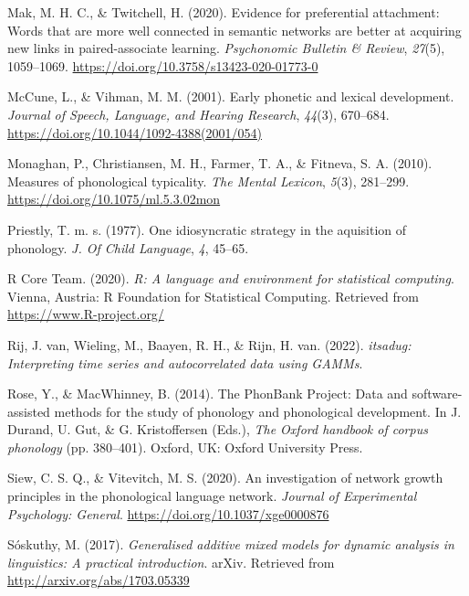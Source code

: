 \documentclass[
  man]{apa6}
\newlength{\cslhangindent}
\newlength{\cslentryspacingunit} %
\newenvironment{CSLReferences}[2] %
 {%
  \setlength{\parindent}{0pt}
  \ifodd #1
  \let\oldpar\par
  \def\par{\hangindent=\cslhangindent\oldpar}
  \fi
  \setlength{\parskip}{#2\cslentryspacingunit}
 }%
 {}
\begin{document}
\begin{CSLReferences}{1}{0}
\leavevmode{}%
Mak, M. H. C., \& Twitchell, H. (2020). Evidence for preferential attachment: Words that are more well connected in semantic networks are better at acquiring new links in paired-associate learning. \emph{Psychonomic Bulletin \& Review}, \emph{27}(5), 1059--1069. \url{https://doi.org/10.3758/s13423-020-01773-0}

\leavevmode{}%
McCune, L., \& Vihman, M. M. (2001). Early phonetic and lexical development. \emph{Journal of Speech, Language, and Hearing Research}, \emph{44}(3), 670--684. \url{https://doi.org/10.1044/1092-4388(2001/054)}

\leavevmode{}%
Monaghan, P., Christiansen, M. H., Farmer, T. A., \& Fitneva, S. A. (2010). Measures of phonological typicality. \emph{The Mental Lexicon}, \emph{5}(3), 281--299. \url{https://doi.org/10.1075/ml.5.3.02mon}

\leavevmode{}%
Priestly, T. m. s. (1977). One idiosyncratic strategy in the aquisition of phonology. \emph{J. Of Child Language}, \emph{4}, 45--65.

\leavevmode{}%
R Core Team. (2020). \emph{R: A language and environment for statistical computing}. Vienna, Austria: R Foundation for Statistical Computing. Retrieved from \url{https://www.R-project.org/}

\leavevmode{}%
Rij, J. van, Wieling, M., Baayen, R. H., \& Rijn, H. van. (2022). \emph{{itsadug}: Interpreting time series and autocorrelated data using GAMMs}.

\leavevmode{}%
Rose, Y., \& MacWhinney, B. (2014). The {PhonBank} {Project}: {Data} and software-assisted methods for the study of phonology and phonological development. In J. Durand, U. Gut, \& G. Kristoffersen (Eds.), \emph{The {Oxford} handbook of corpus phonology} (pp. 380--401). Oxford, UK: Oxford University Press.

\leavevmode{}%
Siew, C. S. Q., \& Vitevitch, M. S. (2020). An investigation of network growth principles in the phonological language network. \emph{Journal of Experimental Psychology: General}. \url{https://doi.org/10.1037/xge0000876}

\leavevmode{}%
Sóskuthy, M. (2017). \emph{Generalised additive mixed models for dynamic analysis in linguistics: A practical introduction}. arXiv. Retrieved from \url{http://arxiv.org/abs/1703.05339}


\end{CSLReferences}
\end{document}
